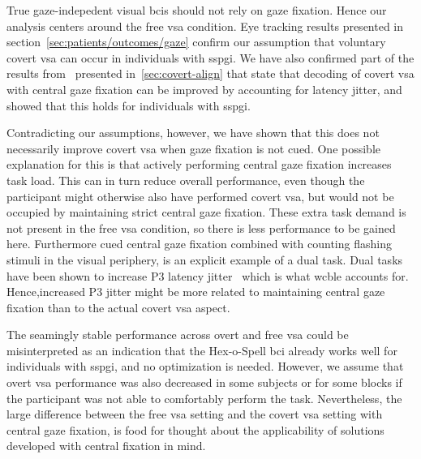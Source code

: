 True gaze-indepedent visual \acp{bci} should not rely on gaze fixation.
Hence our analysis centers around the free \ac{vsa} condition.
Eye tracking results presented in section~\ref{sec:patients/outcomes/gaze}
confirm our assumption that voluntary covert \ac{vsa} can
occur in individuals with \ac{sspgi}.
We have also confirmed part of the results from~\textcite{VanDenKerchove2024}
presented in~\autoref{sec:covert-align} that state that decoding of covert \ac{vsa} with central gaze
fixation can be improved by accounting for latency jitter, and showed that this
holds for individuals with \ac{sspgi}.

Contradicting our assumptions, however, we have shown that this does not
necessarily improve covert \ac{vsa} when gaze fixation is not cued.
One possible explanation for this is that actively performing central gaze fixation
increases task load.
This can in turn reduce overall performance, even though the participant might
otherwise also have performed covert \ac{vsa}, but would not be occupied by
maintaining strict central gaze fixation.
These extra task demand is not present in the free \ac{vsa} condition, so
there is less performance to be gained here.
Furthermore cued central gaze fixation combined with counting flashing stimuli
in the visual periphery, is an explicit example of a dual task.
Dual tasks have been shown to increase P3 latency
jitter~\cite{Polich2007,Arico2014, VanDenKerchove2024}
which is what \ac{wcble} accounts for.
Hence,increased P3 jitter might be more related to maintaining central gaze fixation
than to the actual covert \ac{vsa} aspect.

The seamingly stable performance across overt and free \ac{vsa} could be
misinterpreted as an indication that the Hex-o-Spell \ac{bci} already works
well for individuals with \ac{sspgi}, and no optimization is
needed.
However, we assume that overt \ac{vsa} performance was also decreased in some
subjects or for some blocks if the participant was not able to comfortably
perform the task.
Nevertheless, the large difference between the free \ac{vsa} setting and the
covert \ac{vsa} setting
with central gaze fixation, is food for thought about the applicability of
solutions developed with central fixation in mind.

